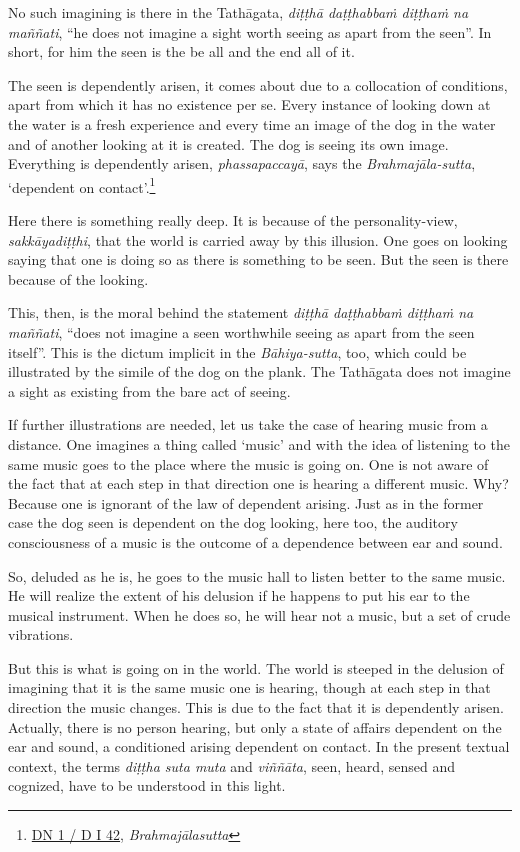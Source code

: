 No such imagining is there in the Tathāgata, \emph{diṭṭhā daṭṭhabbaṁ diṭṭhaṁ na maññati}, ``he does not imagine a sight worth seeing as apart from the seen''. In short, for him the seen is the be all and the end all of it.

The seen is dependently arisen, it comes about due to a collocation of conditions, apart from which it has no existence per se. Every instance of looking down at the water is a fresh experience and every time an image of the dog in the water and of another looking at it is created. The dog is seeing its own image. Everything is dependently arisen, \emph{phassapaccayā}, says the \emph{Brahmajāla-sutta}, `dependent on contact'.\footnote{\href{https://suttacentral.net/dn1/pli/ms}{DN 1 / D I 42}, \emph{Brahmajālasutta}}

Here there is something really deep. It is because of the personality-view, \emph{sakkāyadiṭṭhi}, that the world is carried away by this illusion. One goes on looking saying that one is doing so as there is something to be seen. But the seen is there because of the looking.

This, then, is the moral behind the statement \emph{diṭṭhā daṭṭhabbaṁ diṭṭhaṁ na maññati}, ``does not imagine a seen worthwhile seeing as apart from the seen itself''. This is the dictum implicit in the \emph{Bāhiya-sutta}, too, which could be illustrated by the simile of the dog on the plank. The Tathāgata does not imagine a sight as existing from the bare act of seeing.

If further illustrations are needed, let us take the case of hearing music from a distance. One imagines a thing called `music' and with the idea of listening to the same music goes to the place where the music is going on. One is not aware of the fact that at each step in that direction one is hearing a different music. Why? Because one is ignorant of the law of dependent arising. Just as in the former case the dog seen is dependent on the dog looking, here too, the auditory consciousness of a music is the outcome of a dependence between ear and sound.

So, deluded as he is, he goes to the music hall to listen better to the same music. He will realize the extent of his delusion if he happens to put his ear to the musical instrument. When he does so, he will hear not a music, but a set of crude vibrations.

But this is what is going on in the world. The world is steeped in the delusion of imagining that it is the same music one is hearing, though at each step in that direction the music changes. This is due to the fact that it is dependently arisen. Actually, there is no person hearing, but only a state of affairs dependent on the ear and sound, a conditioned arising dependent on contact. In the present textual context, the terms \emph{diṭṭha suta muta} and \emph{viññāta}, seen, heard, sensed and cognized, have to be understood in this light.

